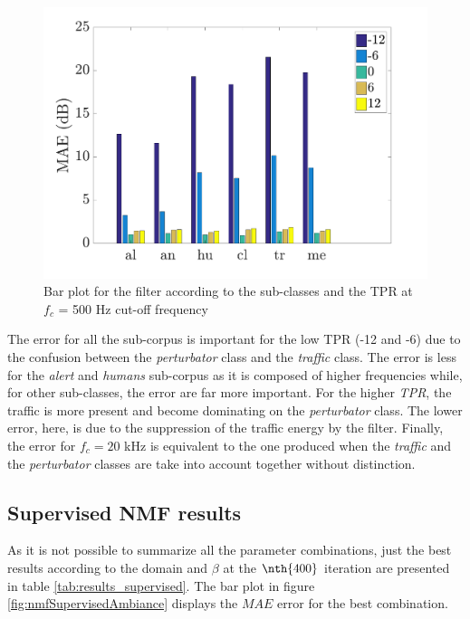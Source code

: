 \documentclass[twocolumn,a4paper,10pt]{article}
\begin{document}
\begin{figure}[hbtp]
\centering
\includegraphics[width=\linewidth]{../image/AmbianceFilter.pdf}
\caption{Bar plot for the filter according to the sub-classes and the TPR at $f_c$ = 500 Hz cut-off frequency}
\label{fig:filterAmbiance}
\end{figure}

The error for all the sub-corpus is important for the low TPR (-12 and -6) due to the confusion between the \textit{perturbator} class and the \textit{traffic} class. The error is less for the \textit{alert} and \textit{humans} sub-corpus as it is composed of higher frequencies while, for other sub-classes, the error are far more important. For the higher \textit{TPR}, the traffic is more present and become dominating on the \textit{perturbator} class. The lower error, here, is due to the suppression of the traffic energy by the filter. Finally, the error for $f_c = 20$ kHz is equivalent to the one produced when the \textit{traffic} and the \textit{perturbator} classes are take into account together without distinction. 

\subsection{Supervised NMF results}

As it is not possible to summarize all the parameter combinations, just the best results according to the domain and $\beta$ at the $\nth{400}$ iteration are presented in table \ref{tab:results_supervised}. The bar plot in figure \ref{fig:nmfSupervisedAmbiance} displays the $MAE$ error for the best combination.\\
\end{document}
